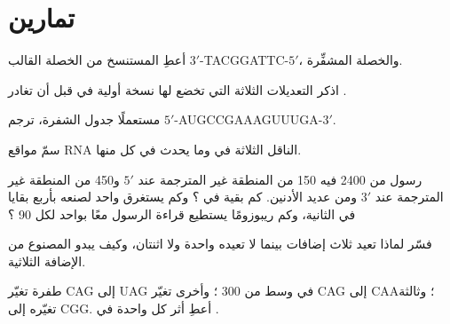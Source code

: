\section{تمارين}

\begin{exercise}[$\star$]\label{exo:b1:gene-expression:1}
أعطِ  المستنسخ من الخصلة القالب
$3'$-TACGGATTC-$5'$، والخصلة المشفِّرة.
\end{exercise}

\begin{exercise}[$\star$]\label{exo:b1:gene-expression:2}
اذكر التعديلات الثلاثة التي تخضع لها نسخة أولية في 
قبل أن تغادر .
\end{exercise}

\begin{exercise}[$\star$]\label{exo:b1:gene-expression:3}
مستعملًا جدول الشفرة، ترجم $5'$-AUGCCGAAAGUUUGA-$3'$.
\end{exercise}

\begin{exercise}[$\star$]\label{exo:b1:gene-expression:4}
سمّ مواقع RNA الناقل الثلاثة في  وما يحدث في كل منها.
\end{exercise}

\begin{exercise}[$\star\star$]\label{exo:b1:gene-expression:5}
رسول من \qty{2400}{}  فيه \qty{150}{} من المنطقة غير
المترجمة عند $5'$ و\qty{450}{} من المنطقة غير المترجمة عند $3'$ ومن
عديد الأدنين. كم بقية في ؟ وكم يستغرق  واحد لصنعه
بأربع بقايا في الثانية، وكم ريبوزومًا يستطيع قراءة الرسول معًا
بواحد لكل \qty{90}{} ؟
\end{exercise}

\begin{exercise}[$\star\star$]\label{exo:b1:gene-expression:6}
فسّر لماذا تعيد ثلاث إضافات   بينما لا تعيده واحدة
ولا اثنتان، وكيف يبدو  المصنوع من الإضافة الثلاثية.
\end{exercise}

\begin{exercise}[$\star\star$]\label{exo:b1:gene-expression:7}
طفرة تغيّر  CAG إلى UAG في وسط  من \qty{300}{} ؛
وأخرى تغيّر CAG إلى CAA؛ وثالثة تغيّره إلى CGG. أعطِ أثر كل واحدة
في .
\end{exercise}

